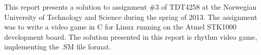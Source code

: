 This report presents a solution to assignment \#3 of TDT4258 at the Norwegian University of Technology and Science during the spring of 2013.
The assignment was to write a video game in C for Linux running on the Atmel STK1000 development board.
The solution presented in this report is rhythm video game, implementing the .SM file format.